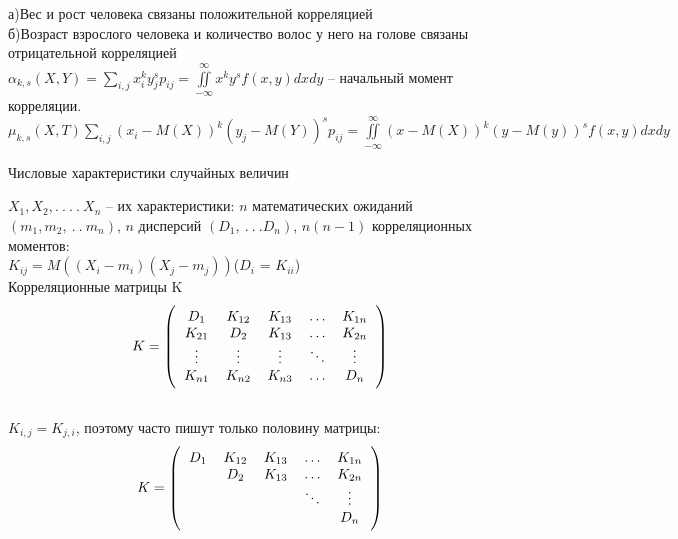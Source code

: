 \documentclass[russian, 12pt, fleqn]{article}
\begin{document}
а)Вес и рост человека связаны положительной корреляцией\\
б)Возраст взрослого человека и количество волос у него на голове связаны отрицательной корреляцией\\
$\alpha_{k,s} (X,Y) = \sum\limits_{i, j} x_i^k y_j^s p_{ij} =  \displaystyle{\iint\limits_{-\infty}^{\infty}} x^k y^s f(x, y) dx dy  $ -- начальный момент корреляции.\\ 
$\mu_{k,s}(X, T)  \sum\limits_{i, j} (x_i - M(X))^k (y_j - M(Y))^s p_{i j} = \displaystyle{\iint\limits_{-\infty}^{\infty}}(x-M(X))^k(y-M(y))^s f(x, y) dxdy$
\begin{center}
$\textbf{Числовые характеристики случайных величин}$
\end{center}
$X_1, X_2, .\ .\ .\ .\ X_n$ -- их характеристики: $n$ математических ожиданий $(m_1, m_2, \ .\ . \  m_n)$, $n$ дисперсий $(D_1, \ .\ .\ . D_n)$,  $n(n-1)$ корреляционных моментов:\\
$K_{ij} = M((X_i - m_i)(X_j - m_j))$($D_i$ = $K_{ii}$)\\
Корреляционные матрицы K
$$
K=\left(\begin{tabular}{c c c c c}
\(D_1\) & \(K_{12}\) & \(K_{13}\) & \(\ldots\) & \(K_{1n}\) \\
\(K_{21}\) &\( D_2\) & \(K_{13}\) & \(\ldots\) &\( K_{2n}\)\\
\(\vdots\) & \(\vdots\) & \(\vdots\) & \(\ddots\) & \(\vdots\) \\
\(K_{n1}\)& \(K_{n2}\) &\( K_{n3}\) & \(\ldots\) & \(D_n\)\\	
\end{tabular}\right)$$\\
$K_{i, j} = K_{j, i}$, поэтому часто пишут только половину матрицы:\\

$$
K=\left(\begin{tabular}{c c c c c}
\(D_1\) & \(K_{12}\) & \(K_{13}\) & \(\ldots\) & \(K_{1n}\) \\
 &\( D_2\) & \(K_{13}\) & \(\ldots\) &\( K_{2n}\)\\
 &  &  & \(\ddots\) & \(\vdots\) \\
 &  & & & \(D_n\)\\	
\end{tabular}\right)$$\\
\end{document}
